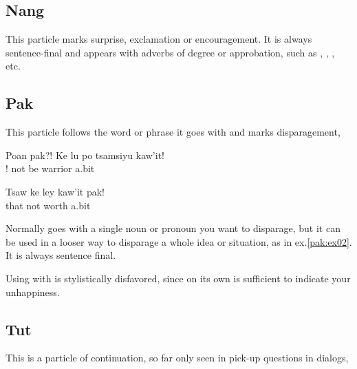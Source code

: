 \subsection{Nang} This particle marks surprise, exclamation or
encouragement.  It is always sentence-final and appears with adverbs
of degree or approbation, such as , ,
, etc. 
   

\subsection{Pak} 
This particle follows the word or phrase it goes with and marks
disparagement,  

\begin{interlin}
\gll Poan pak?! Ke lu po tsamsiyu kaw'it! \\
      ! not be  warrior a.bit \\
\end{interlin}

\begin{interlin} \label{pak:ex02}
\gll Tsaw ke ley kaw'it pak! \\
     that not worth a.bit  \\
 \Ipawl{}
\end{interlin}

\noindent Normally  goes with a single noun or pronoun you want
to disparage, but it can be used in a looser way to disparage a whole
idea or situation, as in ex.\ref{pak:ex02}.  It is always sentence
final.

Using  with  is stylistically disfavored,
since  on its own is sufficient to indicate your unhappiness. 

\subsection{Tut} This is a particle of continuation, so far only seen
in pick-up questions in dialogs, 

